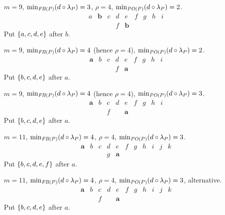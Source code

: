 \documentclass[pagesize, twoside=off, bibliography=totoc, DIV=calc, fontsize=12pt, a4paper]{scrartcl}
\begin{document}
\begin{example}
	$m = 9$, $\minineq[\FBP] = 3$, $\rho = 4$, $\minineq[\POP] = 2$.
	\begin{equation}
		\begin{array}{lllllllll}
			a	& \bm{b}	& c	& d	& e	& f	& g	& h	& i\\
			& & & f & \bm{b}
		\end{array}
	\end{equation}
	Put $\{a, c, d, e\}$ after $b$.
\end{example}

\begin{example}
	$m = 9$, $\minineq[\FBP] = 4$ (hence $\rho = 4$), $\minineq[\POP] = 2$.
	\begin{equation}
		\begin{array}{lllllllll}
			\bm{a}	& b	& c	& d	& e	& f	& g	& h	& i\\
			& & & f & \bm{a}
		\end{array}
	\end{equation}
	Put $\{b, c, d, e\}$ after $a$.
\end{example}

\begin{example}
	$m = 9$, $\minineq[\FBP] = 4$ (hence $\rho = 4$), $\minineq[\POP] = 3$.
	\begin{equation}
		\begin{array}{lllllllll}
			\bm{a}	& b	& c	& d	& e	& f	& g	& h	& i\\
			& & f & & \bm{a}
		\end{array}
	\end{equation}
	Put $\{b, c, d, e\}$ after $a$.
\end{example}

\begin{example}
	$m = 11$, $\minineq[\FBP] = 4$, $\rho = 4$, $\minineq[\POP] = 3$.
	\begin{equation}
		\begin{array}{lllllllllll}
			\bm{a}	& b	& c	& d	& e	& f	& g	& h	& i & j & k\\
			& & & g & \bm{a}
		\end{array}
	\end{equation}
	Put $\{b, c, d, e, f\}$ after $a$.
\end{example}

\begin{example}
	$m = 11$, $\minineq[\FBP] = 4$, $\rho = 4$, $\minineq[\POP] = 3$, alternative.
	\begin{equation}
		\begin{array}{lllllllllll}
			\bm{a}	& b	& c	& d	& e	& f	& g	& h	& i & j & k\\
			& & f & & \bm{a}
		\end{array}
	\end{equation}
	Put $\{b, c, d, e\}$ after $a$.
\end{example}
\end{document}
